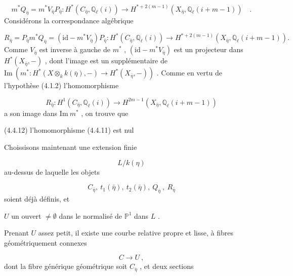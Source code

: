 
\begin{equation}\tag{4.4.9}
 m^*Q_{\bar\eta} = m^*V_{\bar\eta} P_{\bar\eta} : H^*(C_{\bar\eta}, \mathbb{Q}_\ell(i)) \longrightarrow H^{*+2(m-1)}(X_{\bar\eta},\mathbb{Q}_\ell(i+m-1)) \quad .
\end{equation}
Considérons la correspondance algébrique

\begin{equation}\tag{4.4.10}
R_{\bar\eta} = P_{\bar\eta} m^*Q_{\bar\eta} = (\mathrm{id}-m^*V_{\bar\eta})P_{\bar\eta} : H^*(C_{\bar\eta},\mathbb{Q}_\ell(i)) \longrightarrow H^{*+2(m-1)}(X_{\bar\eta},\mathbb{Q}_\ell(i+m-1)).
\end{equation}
Comme $V_{\bar\eta}$ est inverse à gauche de $m^*$ , $(\mathrm{id}-m^*V_{\bar\eta})$ est un projecteur dans $H^*(X_{\bar\eta}, -)$ , dont l'image est un supplémentaire de $\mathrm{Im}\ (m^* : H^*(X \otimes_k k(\bar\eta),-) \longrightarrow H^*(X_{\bar\eta},-))$ . Comme en vertu de l'hypothèse (4.1.2) l'homomorphisme

\begin{equation}\tag{4.4.11}
R_{\bar\eta} : H^1(C_{\bar\eta},\mathbb{Q}_\ell(i)) \longrightarrow H^{2m-1}(X_{\bar\eta},\mathbb{Q}_\ell(i+m-1))
\end{equation}
a son image dans $\mathrm{Im}\ m^*$ , on trouve que

(4.4.12) \quad l'homomorphisme (4.4.11) est nul

Choissisons maintenant une extension finie

\begin{equation*}
L/k(\eta)
\end{equation*}
au-dessus de laquelle les objets

\begin{equation*}
C_{\bar\eta}, \ t_1(\bar\eta), \ t_2(\bar\eta), \ Q_{\bar\eta} \ , \ R_{\bar\eta}
\end{equation*}
soient déjà définis, et

$U$  un ouvert $\neq \emptyset$  dans le normalisé de $\mathbb{P}^1$  dans  $L$ .

Prenant $U$ assez petit, il existe une courbe relative propre et lisse, à fibres géométriquement connexes 



\begin{equation*}
 C \longrightarrow U \ ,
\end{equation*}
dont la fibre générique géométrique soit $C_{\bar\eta}$ , et deux sections

